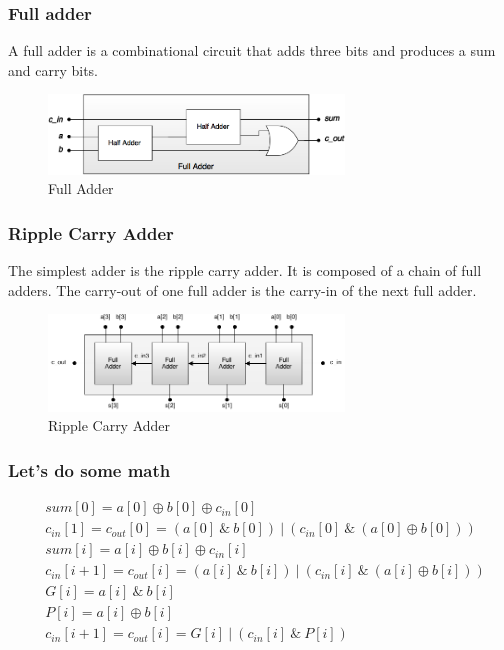 \begin{frame}
    \frametitle{Full adder}
 A full adder is a combinational circuit that adds three bits and produces a sum and carry bits.
    \begin{figure}
        \centering
        \includegraphics[width=0.7\textwidth]{media/full-adder-gates.png}
        \caption{Full Adder}
    \end{figure}
\end{frame}

\begin{frame}
    \frametitle{Ripple Carry Adder}
 The simplest adder is the ripple carry adder. It is composed of a chain of full adders. The carry-out of one full adder is the carry-in of the next full adder.
    \begin{figure}
        \centering
        \includegraphics[width=0.7\textwidth]{media/ripple-carry.png}
        \caption{Ripple Carry Adder}
    \end{figure}
\end{frame}

\begin{frame}
    \frametitle{Let's do some math}
    \begin{equation}
        \begin{aligned}
            &sum[0]=a[0] \oplus b[0] \oplus c_{in}[0]\\
            &c_{in}[1]=c_{out}[0]=(a[0]\ \& \ b[0]) \ | \ (c_{in}[0] \ \& \ (a[0] \oplus b[0]))\\
            &sum[i]=a[i] \oplus b[i] \oplus c_{in}[i]\\
            &c_{in}[i+1]=c_{out}[i]=(a[i] \ \& \ b[i]) \ | \ (c_{in}[i] \ \& \ (a[i] \oplus b[i]))\\
            &G[i]=a[i] \ \& \ b[i]\\
            &P[i]=a[i] \oplus b[i]\\
            &c_{in}[i+1]=c_{out}[i]=G[i] \ | \ (c_{in}[i] \ \& \ P[i])
        \end{aligned}
    \end{equation}
\end{frame}


